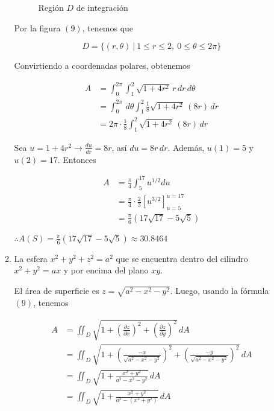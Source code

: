 \documentclass[12pt]{exam}
\begin{document}
\begin{questions}
\begin{enumerate}[a)]
\begin{enumerate}
\begin{figure}[H]
        \caption{Región $D$ de integración}
      \end{figure}

      Por la figura $(9)$, tenemos que

      \[
      D=\{(r,\theta)~|~1\leq r\leq 2,~0\leq \theta \leq 2\pi\}
      \]
      
      Convirtiendo a coordenadas polares, obtenemos

      \begin{align*}
        A &= \int_0^{2\pi}\int_1^2\sqrt{1+4r^2}\,r\,dr\,d\theta\\
        &= \int_0^{2\pi}\,d\theta\int_1^2\frac{1}{8}\sqrt{1+4r^2}\,(8r)\,dr \\
        &= 2\pi \cdot \frac{1}{8} \int_1^2\sqrt{1+4r^2}\,(8r)\,dr
      \end{align*}

      Sea $u=1+4r^2 \rightarrow \frac{du}{dr}=8r$, así $du=8r\,dr$. Además, $u(1)=5$ y $u(2)=17$. Entonces

      \begin{align*}
        A &= \frac{\pi}{4} \int_5^{17} u^{1/2} du\\
        &= \frac{\pi}{4}\cdot \frac{2}{3} \left[ u^{3/2} \right]_{u=5}^{u=17} \\
        &= \frac{\pi}{6} (17\sqrt{17}-5\sqrt{5})
      \end{align*}

      $\therefore A(S)= \frac{\pi}{6} (17\sqrt{17}-5\sqrt{5}) \approx 30.8464$
      
    \item La esfera $x^2+y^2+z^2=a^2$ que se encuentra dentro del cilindro $x^2+y^2=ax$ y por encima del plano $xy$.

      El área de superficie es $z= \sqrt{a^2-x^2-y^2}$. Luego, usando la fórmula $(9)$, tenemos

      \begin{align*}
        A
        &=\iint_D \sqrt{1+\left(\frac{\partial z}{\partial x}\right)^2+\left(\frac{\partial z}{\partial y}\right)^2}\,dA \\
        &= \iint_D \sqrt{1+\left(\frac{-x}{\sqrt{a^2-x^2-y^2}}\right)^2+\left(\frac{-y}{\sqrt{a^2-x^2-y^2}}\right)^2}\,dA \\
        &= \iint_D \sqrt{1+\frac{x^2+y^2}{a^2-x^2-y^2}}\,dA\\
        &= \iint_D \sqrt{1+\frac{x^2+y^2}{a^2-(x^2+y^2)}}\,dA
      \end{align*}


\end{enumerate}
\end{enumerate}
\end{questions}
\end{document}
